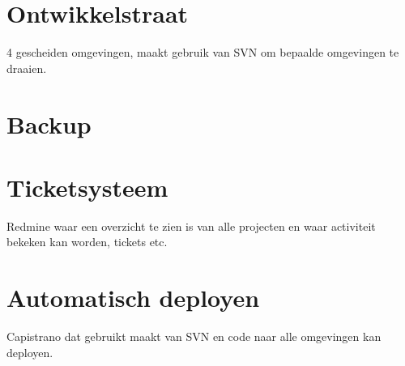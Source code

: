 \section{Ontwikkelstraat}

4 gescheiden omgevingen, maakt gebruik van SVN om bepaalde omgevingen te draaien.

\section{Backup}



\section{Ticketsysteem}

Redmine waar een overzicht te zien is van alle projecten en waar activiteit bekeken kan worden, tickets etc.

\section{Automatisch deployen}

Capistrano dat gebruikt maakt van SVN en code naar alle omgevingen kan deployen.